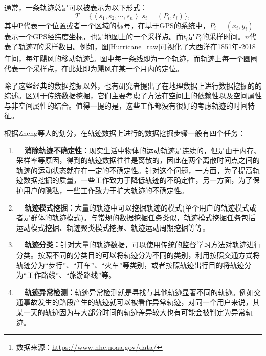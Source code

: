 通常，一条轨迹总是可以被表示为以下形式：
\begin{equation}
\label{eq:traj}
T = \{\left<s_1,s_2,\cdots,s_n\right>|s_i=(P_i,t_i)\},
\end{equation}
其中\gls{P}代表一个位置或者一个区域的标号，在基于GPS的系统中，$P_i = (x_i,y_i)$ 表示一个GPS经纬度坐标，也是地图上的一个采样点。而$t_i$是$P_i$的采样时间。$n$代表了轨迹$T$的采样数目。例如，图\ref{Hurricane_raw}可视化了大西洋在1851年-2018年间，每年飓风的移动轨迹\footnote{数据来源：\url{https://www.nhc.noaa.gov/data/}}。图中每一条线即为一个轨迹，而轨迹上每一个圆圈代表一个采样点，在此处即为飓风在某一个月内的定位。




除了这些经典的数据挖掘以外，也有研究者提出了在地理数据上进行数据挖掘的的综述。区别于传统数据挖掘，它们主要考虑了方法在空间上的依赖性以及空间属性与非空间属性的结合。值得一提的是，这些工作都没有很好的考虑轨迹的时间特征。

根据Zheng等人的划分，在轨迹数据上进行的数据挖掘步骤一般有四个任务：


\begin{enumerate}
    \item \textbf{~~消除轨迹不确定性：}现实生活中物体的运动轨迹是连续的，但是由于内存、采样率等原因，得到的轨迹数据往往是离散的，因此在两个离散时间点之间的轨迹的运动状态就存在一定的不确定性。针对这个问题，一方面，为了提高轨迹数据挖掘的质量，一些工作致力于降低轨迹的不确定性，另一方面，为了保护用户的隐私，一些工作致力于扩大轨迹的不确定性。
    \item \textbf{~~轨迹模式挖掘：}大量的轨迹中可以挖掘轨迹的模式(单个用户的轨迹模式或者是群体的轨迹模式)。与常规的数据挖掘任务类似，轨迹模式挖掘任务包括运动模式挖掘、轨迹聚类模式挖掘、轨迹运动周期挖掘等等。
    \item \textbf{~~轨迹分类：}针对大量的轨迹数据，可以使用传统的监督学习方法对轨迹进行分类。按照不同的分类目的可以将轨迹分为不同的类别，利用按照交通方式将轨迹分为“步行”、“开车”、“火车”等类别，或者按照轨迹出行目的将轨迹分为“工作路线”、“旅游路线”等。
    \item \textbf{~~轨迹异常检测：}轨迹异常检测就是寻找与其他轨迹显著不同的轨迹。例如交通事故发生的路段产生的轨迹就可以被看作异常轨迹，对同一个用户来说，其某一天的轨迹因为与大部分时间的轨迹差异较大也有可能会被判定为异常轨迹。
\end{enumerate}

